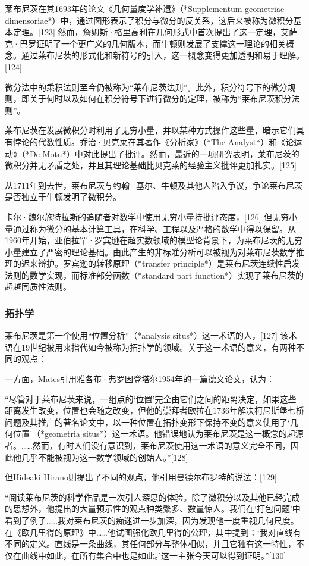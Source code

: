 莱布尼茨在其1693年的论文《几何量度学补遗》（*Supplementum geometriae dimensoriae*）中，通过图形表示了积分与微分的反关系，这后来被称为微积分基本定理。[123] 然而，詹姆斯·格里高利在几何形式中首次提出了这一定理，艾萨克·巴罗证明了一个更广义的几何版本，而牛顿则发展了支撑这一理论的相关概念。通过莱布尼茨的形式化和新符号的引入，这一概念变得更加透明和易于理解。[124]  

微分法中的乘积法则至今仍被称为“莱布尼茨法则”。此外，积分符号下的微分规则，即关于何时以及如何在积分符号下进行微分的定理，被称为“莱布尼茨积分法则”。

莱布尼茨在发展微积分时利用了无穷小量，并以某种方式操作这些量，暗示它们具有悖论的代数性质。乔治·贝克莱在其著作《分析家》（*The Analyst*）和《论运动》（*De Motu*）中对此提出了批评。然而，最近的一项研究表明，莱布尼茨的微积分并无矛盾之处，并且其理论基础比贝克莱的经验主义批评更加扎实。[125]  

从1711年到去世，莱布尼茨与约翰·基尔、牛顿及其他人陷入争议，争论莱布尼茨是否独立于牛顿发明了微积分。

卡尔·魏尔施特拉斯的追随者对数学中使用无穷小量持批评态度，[126] 但无穷小量通过称为微分的基本计算工具，在科学、工程以及严格的数学中得以保留。从1960年开始，亚伯拉罕·罗宾逊在超实数领域的模型论背景下，为莱布尼茨的无穷小量建立了严密的理论基础。由此产生的非标准分析可以被视为对莱布尼茨数学推理的迟来辩护。罗宾逊的转移原理（*transfer principle*）是莱布尼茨连续性启发法则的数学实现，而标准部分函数（*standard part function*）实现了莱布尼茨的超越同质性法则。
\subsubsection{拓扑学}
莱布尼茨是第一个使用“位置分析”（*analysis situs*）这一术语的人，[127] 该术语在19世纪被用来指代如今被称为拓扑学的领域。关于这一术语的意义，有两种不同的观点：

一方面，Mates引用雅各布·弗罗因登塔尔1954年的一篇德文论文，认为：

“尽管对于莱布尼茨来说，一组点的‘位置’完全由它们之间的距离决定，如果这些距离发生改变，位置也会随之改变，但他的崇拜者欧拉在1736年解决柯尼斯堡七桥问题及其推广的著名论文中，以一种位置在拓扑变形下保持不变的意义使用了‘几何位置’（*geometria situs*）这一术语。他错误地认为莱布尼茨是这一概念的起源者。……然而，有时人们没有意识到，莱布尼茨使用这一术语的意义完全不同，因此他几乎不能被视为这一数学领域的创始人。”[128]

但Hideaki Hirano则提出了不同的观点，他引用曼德尔布罗特的说法：[129]

“阅读莱布尼茨的科学作品是一次引人深思的体验。除了微积分以及其他已经完成的思想外，他提出的大量预示性的观点种类繁多、数量惊人。我们在‘打包问题’中看到了例子……我对莱布尼茨的痴迷进一步加深，因为发现他一度重视几何尺度。在《欧几里得的原理》中……他试图强化欧几里得的公理，其中提到：‘我对直线有不同的定义。直线是一条曲线，其任何部分与整体相似，并且它独有这一特性，不仅在曲线中如此，在所有集合中也是如此。’这一主张今天可以得到证明。”[130]